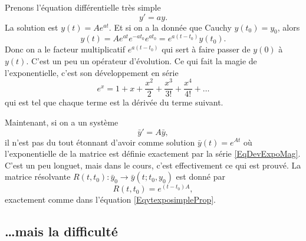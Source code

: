 Prenons l'équation différentielle très simple
\begin{equation}
	y'=ay.
\end{equation}
La solution est $y(t)=A e^{at}$. Et si on a la donnée que Cauchy $y(t_0)=y_0$, alors
\begin{equation}		\label{EqytexposimpleProp}
	y(t)=A e^{at} e^{-at_0} e^{at_0}= e^{a(t-t_0)}y(t_0).
\end{equation}
Donc on a le facteur multiplicatif $ e^{a(t-t_0)}$ qui sert à faire passer de $y(0)$ à $y(t)$. C'est un peu un opérateur d'évolution. Ce qui fait la magie  de l'exponentielle, c'est son développement en série
\begin{equation}		\label{EqDevExpoMag}
	e^x=1+x+\frac{ x^2 }{ 2 }+\frac{ x^3 }{ 3! }+\frac{ x^4 }{ 4! }+\ldots
\end{equation}
qui est tel que chaque terme est la dérivée du terme suivant.

Maintenant, si on a un système
\begin{equation}
	\bar y'=A\bar y,
\end{equation}
il n'est pas du tout étonnant d'avoir comme solution $\bar y(t)= e^{At}$ où l'exponentielle de la matrice est définie exactement par la série \eqref{EqDevExpoMag}. C'est un peu longuet, mais dans le cours, c'est effectivement ce qui est prouvé. La matrice résolvante $R(t,t_0)\colon \bar y_0\to \bar y(t;t_0,y_0)$ est donné par
\begin{equation}
	R(t,t_0)= e^{(t-t_0)A},
\end{equation}
exactement comme dans l'équation \eqref{EqytexposimpleProp}.

					\subsection{\ldots mais la difficulté}

